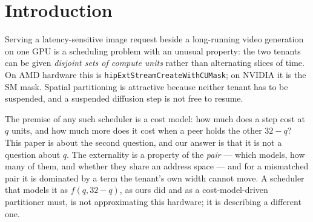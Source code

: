 \documentclass[sigconf,nonacm]{acmart}
\begin{document}
\begin{abstract}
Finally, a methodological result we would report even if the rest had
gone the other way. Three separate cost models here were beautiful,
quantitative and wrong, each an artifact of a deferred-event instrument
that repeats one stale reading when the CPU runs ahead --- including one
fitting five splits to within $3$--$9\%$ over a $3\times$ range. The
control that catches all three is cheap and was missing from every one:
re-measure the solo \emph{after} the co-run, with the peers idle. A
penalty that does not vanish when the peers stop is not a penalty.
\end{abstract}

\maketitle

\section{Introduction}

Serving a latency-sensitive image request beside a long-running video
generation on one GPU is a scheduling problem with an unusual property:
the two tenants can be given \emph{disjoint sets of compute units}
rather than alternating slices of time. On AMD hardware this is
\texttt{hipExtStreamCreateWithCUMask}; on NVIDIA it is the SM mask.
Spatial partitioning is attractive because neither tenant has to be
suspended, and a suspended diffusion step is not free to resume.

The premise of any such scheduler is a cost model: how much does a step
cost at $q$ units, and how much more does it cost when a peer holds the
other $32-q$? This paper is about the second question, and our answer is
that it is not a question about $q$. The externality is a property of the
\emph{pair} --- which models, how many of them, and whether they share an
address space --- and for a mismatched pair it is dominated by a term the
tenant's own width cannot move. A scheduler that models it as
$f(q, 32-q)$, as ours did and as a cost-model-driven partitioner must,
is not approximating this hardware; it is describing a different one.
\end{document}
